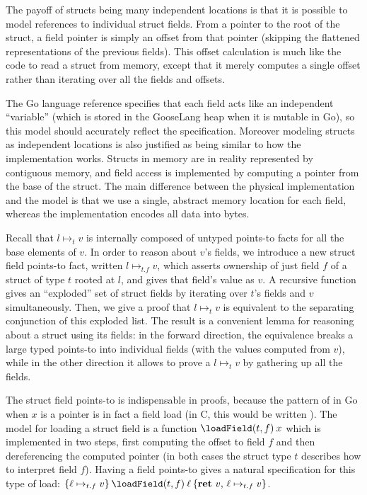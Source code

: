 The payoff of structs being many independent locations is that it is
possible to model references to individual struct fields. From a pointer
to the root of the struct, a field pointer is simply an offset from that
pointer (skipping the flattened representations of the previous fields).
This offset calculation is much like the code to read a struct from
memory, except that it merely computes a single offset rather than
iterating over all the fields and offsets.

The Go language reference specifies that each field acts like an
independent ``variable'' (which is stored in the GooseLang heap when it
is mutable in Go), so this model should accurately reflect the
specification. Moreover modeling structs as independent locations is
also justified as being similar to how the implementation works. Structs
in memory are in reality represented by contiguous memory, and field
access is implemented by computing a pointer from the base of the
struct. The main difference between the physical implementation and the
model is that we use a single, abstract memory location for each field,
whereas the implementation encodes all data into bytes.

Recall that $l \mapsto_t v$ is internally composed of untyped
points-to facts for all the base elements of $v$. In order to reason
about $v$'s fields, we introduce a new struct field points-to fact,
written $l \mapsto_{t.f} v$, which asserts ownership of just field
$f$ of a struct of type $t$ rooted at $l$, and gives that field's
value as $v$. A recursive function gives an ``exploded'' set of struct
fields by iterating over $t$'s fields and $v$ simultaneously. Then,
we give a proof that $l \mapsto_t v$ is equivalent to the separating
conjunction of this exploded list. The result is a convenient lemma for
reasoning about a struct using its fields: in the forward direction, the
equivalence breaks a large typed points-to into individual fields (with
the values computed from $v$), while in the other direction it allows
to prove a $l \mapsto_t v$ by gathering up all the fields.

The struct field points-to is indispensable in proofs, because the
pattern of  in Go when $x$ is a pointer is in fact a field
load (in C, this would be written ). The model
for loading a struct field is a function $\loadField(t, f) \app x$
which is implemented in two steps, first computing the offset to field
$f$ and then dereferencing the computed pointer (in both cases the struct type $t$
describes how to interpret field $f$). Having a field points-to gives
a natural specification for this type of load:
$\hoare{\ell \mapsto_{t.f} v}{\loadField(t, f) \app \ell}{\Ret{v} \ell \mapsto_{t.f} v}$.

